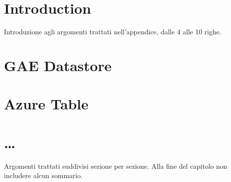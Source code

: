 \section{Introduction}
Introduzione agli argomenti trattati nell'appendice, dalle 4 alle 10 righe.

\section{GAE Datastore}
\label{appendix:datastore-config}

\section{Azure Table}
\label{appendix:table-config}

\section{\dots}
Argomenti trattati suddivisi sezione per sezione. 
Alla fine del capitolo non includere alcun sommario.


